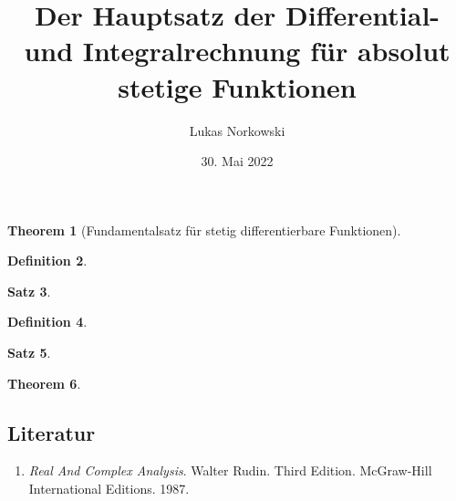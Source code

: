 \documentclass[a4paper, ngerman]{article}
\title{Der Hauptsatz der Differential- und Integralrechnung für absolut stetige Funktionen}
\author{Lukas Norkowski}
\date{30. Mai 2022}
\theoremstyle{mytheorem}
\newtheorem{theorem}{Theorem}
\newtheorem{satz}[theorem]{Satz}
\theoremstyle{definition}
\newtheorem{definition}[theorem]{Definition}
\begin{document}
	\maketitle
	\thispagestyle{empty}	

\begin{theorem}[Fundamentalsatz für stetig differentierbare Funktionen]
	
\end{theorem}

\begin{definition}
	
\end{definition}

\begin{satz}
  
\end{satz}

\begin{definition}
  
\end{definition}

\begin{satz}
  
\end{satz}

\begin{theorem}
  
\end{theorem}

\subsection*{Literatur}
\begin{enumerate}
	\item \emph{Real And Complex Analysis}. Walter Rudin. Third Edition. McGraw-Hill International Editions. 1987.
\end{enumerate}
\end{document}
